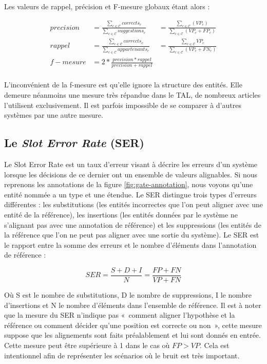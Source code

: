 \documentclass[12pt,a4paper,times,twoside,openright]{report}
\begin{document}
Les valeurs de rappel, précision et F-mesure globaux étant alors :

\begin{equation}\label{eq:f1score-global}
\begin{aligned}
precision &= \frac{\sum_{c \in \mathcal{C}} corrects_{c}}{\sum_{c \in \mathcal{C}} suggestions_{c}} &= \frac{\sum_{c \in \mathcal{C}} (VP_{c})}{\sum_{c \in \mathcal{C}} (VP_{c} + FP_{c})} \\
rappel &= \frac{\sum_{c \in \mathcal{C}} corrects_{c}}{\sum_{c \in \mathcal{C}} appartenants_{c}} &= \frac{\sum_{c \in \mathcal{C}} VP_{c}}{\sum_{c \in \mathcal{C}} (VP_{c} + FN_{c})} \\
f-mesure &= 2 * \frac{precision * rappel}{precision + rappel} \\
\end{aligned}
\end{equation}

L'inconvénient de la f-mesure est qu'elle ignore la structure des entités. Elle demeure néanmoins une mesure très répandue dans le TAL, de nombreux articles l'utilisent exclusivement. Il est parfois impossible de se comparer à d'autres systèmes par une autre mesure.

\subsection{Le \emph{Slot Error Rate} (SER)}
\label{subsec:SER}

Le Slot Error Rate \citep{makhoul1999performance} est un taux d'erreur visant à décrire les erreurs d'un système lorsque les décisions de ce dernier ont un ensemble de valeurs alignables. Si nous reprenons les annotations de la figure \ref{fig:gate-annotation}, nous voyons qu'une entité nommée a un type et une étendue. Le SER distingue trois types d'erreurs différentes : les substitutions (les entités incorrectes que l'on peut aligner avec une entité de la référence), les insertions (les entités données par le système ne s'alignant pas avec une annotation de référence) et les suppressions (les entités de la référence que l'on ne peut pas aligner avec une sortie du système). Le SER est le rapport entre la somme des erreurs et le nombre d'éléments dans l'annotation de référence :

\begin{equation}\label{eq:SER-base}
SER = \frac{S + D + I}{N} = \frac{FP + FN}{VP + FN}
\end{equation}

Où S est le nombre de substitutions, D le nombre de suppressions, I le nombre d'insertions et N le nombre d'éléments dans l'ensemble de référence. Il est à noter que la mesure du SER n'indique pas «\ comment aligner l'hypothèse et la référence ou comment décider qu'une position est correcte ou non\ », cette mesure suppose que les alignements sont faits préalablement et lui sont donnés en entrée. Cette mesure peut être supérieure à 1 dans le cas où $FP > VP$. Cela est intentionnel afin de représenter les scénarios où le bruit est très important.
\end{document}
